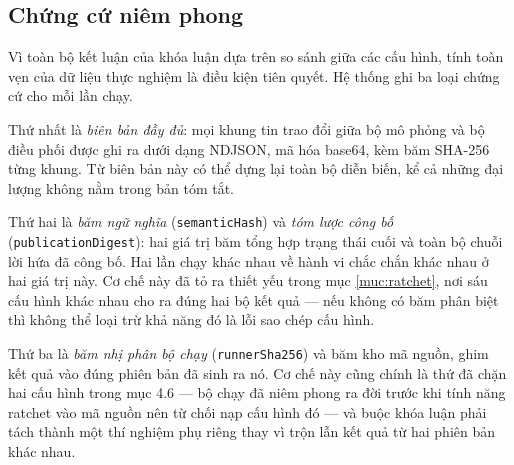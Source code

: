 \subsection{Chứng cứ niêm phong}

Vì toàn bộ kết luận của khóa luận dựa trên so sánh giữa các cấu hình, tính toàn vẹn của dữ liệu
thực nghiệm là điều kiện tiên quyết. Hệ thống ghi ba loại chứng cứ cho mỗi lần chạy.

Thứ nhất là \emph{biên bản đầy đủ}: mọi khung tin trao đổi giữa bộ mô phỏng và bộ điều phối
được ghi ra dưới dạng NDJSON, mã hóa base64, kèm băm SHA-256 từng khung. Từ biên bản này có thể
dựng lại toàn bộ diễn biến, kể cả những đại lượng không nằm trong bản tóm tắt.

Thứ hai là \emph{băm ngữ nghĩa} (\texttt{semanticHash}) và \emph{tóm lược công bố}
(\texttt{publicationDigest}): hai giá trị băm tổng hợp trạng thái cuối và toàn bộ chuỗi lời hứa
đã công bố. Hai lần chạy khác nhau về hành vi chắc chắn khác nhau ở hai giá trị này. Cơ chế
này đã tỏ ra thiết yếu trong mục \ref{muc:ratchet}, nơi sáu cấu hình khác nhau cho ra đúng hai bộ kết quả ---
nếu không có băm phân biệt thì không thể loại trừ khả năng đó là lỗi sao chép cấu hình.

Thứ ba là \emph{băm nhị phân bộ chạy} (\texttt{runnerSha256}) và băm kho mã nguồn, ghim kết quả
vào đúng phiên bản đã sinh ra nó. Cơ chế này cũng chính là thứ đã chặn hai cấu hình trong mục
4.6 --- bộ chạy đã niêm phong ra đời trước khi tính năng ratchet vào mã nguồn nên từ chối nạp
cấu hình đó --- và buộc khóa luận phải tách thành một thí nghiệm phụ riêng thay vì trộn lẫn kết
quả từ hai phiên bản khác nhau.

